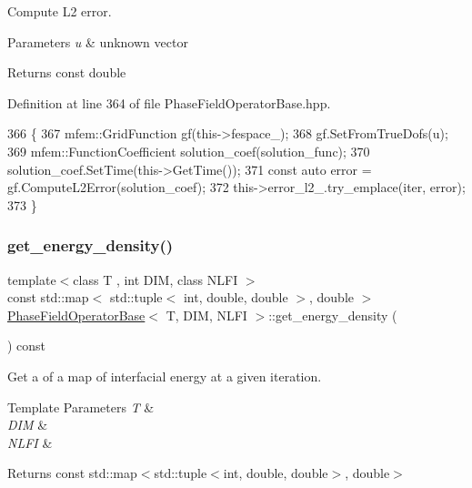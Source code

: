 Compute L2 error. 


\begin{DoxyParams}{Parameters}
{\em u} & unknown vector \\
\hline
\end{DoxyParams}
\begin{DoxyReturn}{Returns}
const double 
\end{DoxyReturn}


Definition at line 364 of file Phase\+Field\+Operator\+Base.\+hpp.


\begin{DoxyCode}
366                                                                    \{
367   mfem::GridFunction gf(this->fespace\_);
368   gf.SetFromTrueDofs(u);
369   mfem::FunctionCoefficient solution\_coef(solution\_func);
370   solution\_coef.SetTime(this->GetTime());
371   \textcolor{keyword}{const} \textcolor{keyword}{auto} error = gf.ComputeL2Error(solution\_coef);
372   this->error\_l2\_.try\_emplace(iter, error);
373 \}
\end{DoxyCode}
\mbox{\label{classPhaseFieldOperatorBase_a8428da5d747f60f7ccbd79c879ca8d25}} 
\subsubsection{\texorpdfstring{get\+\_\+energy\+\_\+density()}{get\_energy\_density()}}
{\footnotesize\ttfamily template$<$class T , int D\+IM, class N\+L\+FI $>$ \\
const std\+::map$<$ std\+::tuple$<$ int, double, double $>$, double $>$ \hyperlink{classPhaseFieldOperatorBase}{Phase\+Field\+Operator\+Base}$<$ T, D\+IM, N\+L\+FI $>$\+::get\+\_\+energy\+\_\+density (\begin{DoxyParamCaption}{ }\end{DoxyParamCaption}) const}



Get a of a map of interfacial energy at a given iteration. 


\begin{DoxyTemplParams}{Template Parameters}
{\em T} & \\
\hline
{\em D\+IM} & \\
\hline
{\em N\+L\+FI} & \\
\hline
\end{DoxyTemplParams}
\begin{DoxyReturn}{Returns}
const std\+::map$<$std\+::tuple$<$int, double, double$>$, double$>$ 
\end{DoxyReturn}


